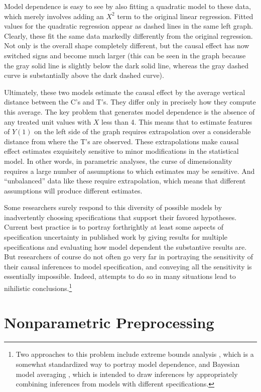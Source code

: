 \documentclass[11pt,titlepage]{article}
\begin{document}
Model dependence is easy to see by also fitting a quadratic model to
these data, which merely involves adding an $X^2$ term to the original
linear regression.  Fitted values for the quadratic regression appear
as dashed lines in the same left graph.  Clearly, these fit the same
data markedly differently from the original regression.  Not only is
the overall shape completely different, but the causal effect has now
switched signs and become much larger (this can be seen in the graph
because the gray solid line is slightly below the dark solid line,
whereas the gray dashed curve is substantially above the dark dashed
curve).

Ultimately, these two models estimate the causal effect by the average
vertical distance between the C's and T's.  They differ only in
precisely how they compute this average.  The key problem that
generates model dependence is the absence of any treated unit values
with $X$ less than 4.  This means that to estimate features of $Y(1)$
on the left side of the graph requires extrapolation over a
considerable distance from where the T's are observed.  These
extrapolations make causal effect estimates exquisitely sensitive to
minor modifications in the statistical model.  In other words, in
parametric analyses, the curse of dimensionality requires a large
number of assumptions to which estimates may be sensitive.  And
``unbalanced'' data like these require extrapolation, which means that
different assumptions will produce different estimates.

Some researchers surely respond to this diversity of possible models
by inadvertently choosing specifications that support their favored
hypotheses.  Current best practice is to portray forthrightly at least
some aspects of specification uncertainty in published work by giving
results for multiple specifications and evaluating how model dependent
the substantive results are.  But researchers of course do not often
go very far in portraying the sensitivity of their causal inferences
to model specification, and conveying all the sensitivity is
essentially impossible.  Indeed, attempts to do so in many situations
lead to nihilistic conclusions.\footnote{Two approaches to this
  problem include extreme bounds analysis \citep{Leamer78}, which is a
  somewhat standardized way to portray model dependence, and Bayesian
  model averaging \citep{HoeMadRaf99,ImaKin04}, which is intended to
  draw inferences by appropriately combining inferences from models
  with different specifications.}

\section{Nonparametric Preprocessing} \label{s:nonparpreproc}
\end{document}

